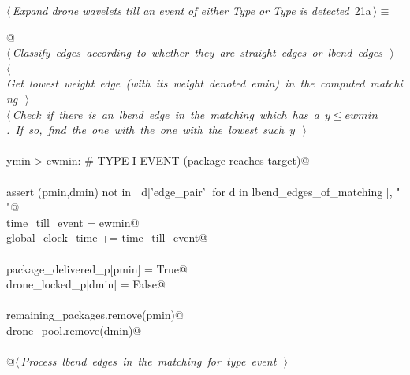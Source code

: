 \documentclass[10pt, english, oneside]{report}
\begin{document}
\begin{flushleft} \small
\begin{minipage}{\linewidth}\label{scrap21}\raggedright\small
{} $\langle\,${\itshape Expand drone wavelets till an event of either Type  or Type  is detected}\nobreak\ {\footnotesize {21a}}$\,\rangle\equiv$
\vspace{-1ex}
\begin{list}{}{} \item
\mbox{}\verb@   @\\
\mbox{}\verb@@\hbox{$\langle\,${\itshape Classify edges according to whether they are straight edges or lbend edges}\nobreak\ {\footnotesize {}}$\,\rangle$}\verb@@\\
\mbox{}\verb@@\hbox{$\langle\,${\itshape Get lowest weight edge (with its weight denoted emin) in the computed matching}\nobreak\ {\footnotesize {}}$\,\rangle$}\verb@@\\
\mbox{}\verb@@\hbox{$\langle\,${\itshape Check if there is an lbend edge in the matching which has a $y\leq ewmin$. If so, find the one with the one with the lowest such $y$}\nobreak\ {\footnotesize {}}$\,\rangle$}\verb@@\\
\mbox{}\verb@@\\
\mbox{}\verb@if ymin > ewmin:  # TYPE I EVENT (package reaches target)@\\
\mbox{}\verb@@\\
\mbox{}\verb@    assert (pmin,dmin) not in [ d['edge_pair']  for d in lbend_edges_of_matching ], " "@\\
\mbox{}\verb@    time_till_event    = ewmin@\\
\mbox{}\verb@    global_clock_time += time_till_event@\\
\mbox{}\verb@@\\
\mbox{}\verb@    package_delivered_p[pmin] = True@\\
\mbox{}\verb@    drone_locked_p[dmin]      = False@\\
\mbox{}\verb@@\\
\mbox{}\verb@    remaining_packages.remove(pmin)@\\
\mbox{}\verb@    drone_pool.remove(dmin)@\\
\mbox{}\verb@@\\
\mbox{}\verb@    @\hbox{$\langle\,${\itshape Process lbend edges in the matching for type  event}\nobreak\ {\footnotesize {}}$\,\rangle$}\verb@@\\

\end{list}
\end{minipage}
\end{flushleft}
\end{document}
